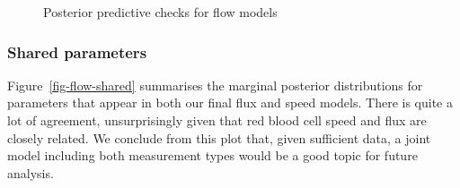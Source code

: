 \documentclass[
  letterpaper,
  DIV=11,
  numbers=noendperiod,
  oneside]{scrartcl}
\theoremstyle{plain}
\theoremstyle{remark}
\begin{document}
\begin{figure}


\caption{\label{fig-flow-ppc}Posterior predictive checks for flow
models}

\end{figure}%

\subsubsection{Shared parameters}\label{shared-parameters}

Figure~\ref{fig-flow-shared} summarises the marginal posterior
distributions for parameters that appear in both our final flux and
speed models. There is quite a lot of agreement, unsurprisingly given
that red blood cell speed and flux are closely related. We conclude from
this plot that, given sufficient data, a joint model including both
measurement types would be a good topic for future analysis.
\end{document}
